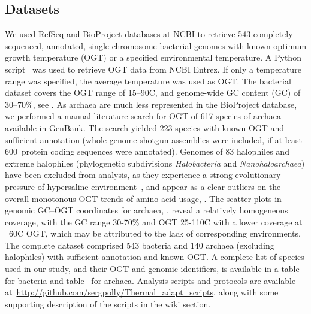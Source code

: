 \documentclass[10pt,letterpaper]{article}
\newcommand{\PROTEINLIMIT}{600}
\begin{document}
\subsection*{Datasets}
We used  RefSeq and BioProject databases at NCBI to retrieve 543 completely sequenced, annotated, single-chromosome bacterial genomes with known optimum growth temperature (OGT) or a specified environmental temperature. A Python script~\cite{Cock2009Biopython} was used to retrieve OGT data from NCBI Entrez. If only a temperature range was specified, the average temperature was used as OGT. The bacterial dataset covers the OGT range of 15--90\textdegree C, and genome-wide GC content (GC) of 30--70\%, see .
As archaea are much less represented in the BioProject database, we performed a manual literature search for OGT of 617 species of archaea available in GenBank. The search yielded 223 species with known OGT and sufficient annotation (whole genome shotgun assemblies were included, if at least \PROTEINLIMIT \ protein coding sequences were annotated). Genomes of 83 halophiles and extreme halophiles (phylogenetic subdivisions {\it Halobacteria} and {\it Nanohaloarchaea}) have been excluded from analysis, as they experience a strong evolutionary pressure of hypersaline environment~\cite{Fukuchi2003Unique}, and appear as a clear outliers on the overall monotonous OGT trends of amino acid usage,  . The scatter plots in genomic GC--OGT coordinates for archaea, , reveal a relatively homogeneous coverage, with the GC range 30-70\% and OGT 25-110\textdegree C with a lower coverage at ~60\textdegree C OGT, which may be attributed to the lack of corresponding environments.  The complete dataset comprised 543 bacteria and 140 archaea (excluding halophiles) with sufficient annotation and known OGT. A complete list of species used in our study, and their OGT and genomic identifiers, is available in a table~ for bacteria and table~ for archaea. Analysis scripts and protocols are available at~\url{http://github.com/sergpolly/Thermal_adapt_scripts}, along with some supporting description of the scripts in the wiki section.
\end{document}
